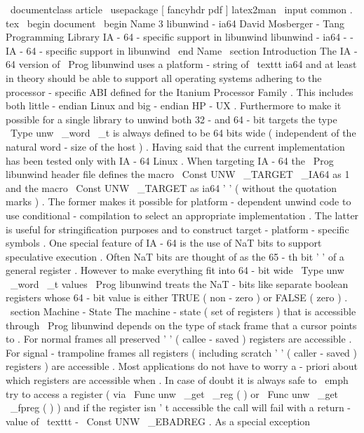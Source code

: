 \
documentclass
{
article
}
\
usepackage
[
fancyhdr
pdf
]
{
latex2man
}
\
input
{
common
.
tex
}
\
begin
{
document
}
\
begin
{
Name
}
{
3
}
{
libunwind
-
ia64
}
{
David
Mosberger
-
Tang
}
{
Programming
Library
}
{
IA
-
64
-
specific
support
in
libunwind
}
libunwind
-
ia64
-
-
IA
-
64
-
specific
support
in
libunwind
\
end
{
Name
}
\
section
{
Introduction
}
The
IA
-
64
version
of
\
Prog
{
libunwind
}
uses
a
platform
-
string
of
\
texttt
{
ia64
}
and
at
least
in
theory
should
be
able
to
support
all
operating
systems
adhering
to
the
processor
-
specific
ABI
defined
for
the
Itanium
Processor
Family
.
This
includes
both
little
-
endian
Linux
and
big
-
endian
HP
-
UX
.
Furthermore
to
make
it
possible
for
a
single
library
to
unwind
both
32
-
and
64
-
bit
targets
the
type
\
Type
{
unw
\
_word
\
_t
}
is
always
defined
to
be
64
bits
wide
(
independent
of
the
natural
word
-
size
of
the
host
)
.
Having
said
that
the
current
implementation
has
been
tested
only
with
IA
-
64
Linux
.
When
targeting
IA
-
64
the
\
Prog
{
libunwind
}
header
file
defines
the
macro
\
Const
{
UNW
\
_TARGET
\
_IA64
}
as
1
and
the
macro
\
Const
{
UNW
\
_TARGET
}
as
ia64
'
'
(
without
the
quotation
marks
)
.
The
former
makes
it
possible
for
platform
-
dependent
unwind
code
to
use
conditional
-
compilation
to
select
an
appropriate
implementation
.
The
latter
is
useful
for
stringification
purposes
and
to
construct
target
-
platform
-
specific
symbols
.
One
special
feature
of
IA
-
64
is
the
use
of
NaT
bits
to
support
speculative
execution
.
Often
NaT
bits
are
thought
of
as
the
65
-
th
bit
'
'
of
a
general
register
.
However
to
make
everything
fit
into
64
-
bit
wide
\
Type
{
unw
\
_word
\
_t
}
values
\
Prog
{
libunwind
}
treats
the
NaT
-
bits
like
separate
boolean
registers
whose
64
-
bit
value
is
either
TRUE
(
non
-
zero
)
or
FALSE
(
zero
)
.
\
section
{
Machine
-
State
}
The
machine
-
state
(
set
of
registers
)
that
is
accessible
through
\
Prog
{
libunwind
}
depends
on
the
type
of
stack
frame
that
a
cursor
points
to
.
For
normal
frames
all
preserved
'
'
(
callee
-
saved
)
registers
are
accessible
.
For
signal
-
trampoline
frames
all
registers
(
including
scratch
'
'
(
caller
-
saved
)
registers
)
are
accessible
.
Most
applications
do
not
have
to
worry
a
-
priori
about
which
registers
are
accessible
when
.
In
case
of
doubt
it
is
always
safe
to
\
emph
{
try
}
to
access
a
register
(
via
\
Func
{
unw
\
_get
\
_reg
}
(
)
or
\
Func
{
unw
\
_get
\
_fpreg
}
(
)
)
and
if
the
register
isn
'
t
accessible
the
call
will
fail
with
a
return
-
value
of
\
texttt
{
-
}
\
Const
{
UNW
\
_EBADREG
}
.
As
a
special
exception
